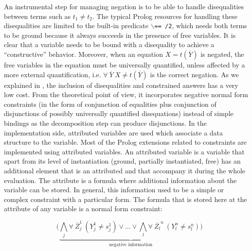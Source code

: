 \documentclass{tlp}
\begin{document}
An instrumental step for managing negation is to be able to handle
disequalities between terms such as $t_1 \neq t_2$.  The typical
Prolog resources for handling these disequalities are limited to the
built-in predicate $\backslash${\tt == /2}, which needs both terms to be
ground because it always succeeds in the presence of free variables.
It is clear that a variable needs to be bound with a disequality to
achieve a ``constructive'' behavior.  Moreover, when an equation $X =
t(\overline{Y})$ is negated, the free variables in the equation must
be universally quantified, unless affected by a more external
quantification, i.e. $\forall~ \overline{Y}~X \neq t(\overline{Y})$ is
the correct negation.  As we explained in \cite{SusanaPADL2000}, the
inclusion of disequalities and constrained answers has a very low
cost. From the theoretical point of view, it incorporates negative
normal form constraints (in the form of conjunction of equalities plus
conjunction of disjunctions of possibly universally quantified
disequations) instead of simple bindings as the decomposition step can
produce disjunctions. In the implementation side, attributed variables
\cite{Holzbaur,Carlsson} are used which associate a data structure to
the variable. Most of the Prolog extensions related to constraints are
implemented using attributed variables. An attributed variable is a
variable that apart from its level of instantiation (ground, partially
instantiated, free) has an additional element that is an attributed
and that accompany it during the whole evaluation. The attribute is a
formula where additional information about the variable can be
stored. In general, this information used to be a simple or complex
constraint with a particular form. The formula that is stored here at
the attribute of any variable is a normal form constraint:

\[~~~~( \underbrace{\bigwedge_j \forall~ \overline{Z}_j^1~(Y_j^1 \neq s_j^1) 
\vee \ldots \vee \bigwedge_l \forall~ \overline{Z_l}^n~(Y_l^n \neq s_l^n) ) }_{\mbox{negative information}} \]


\end{document}
